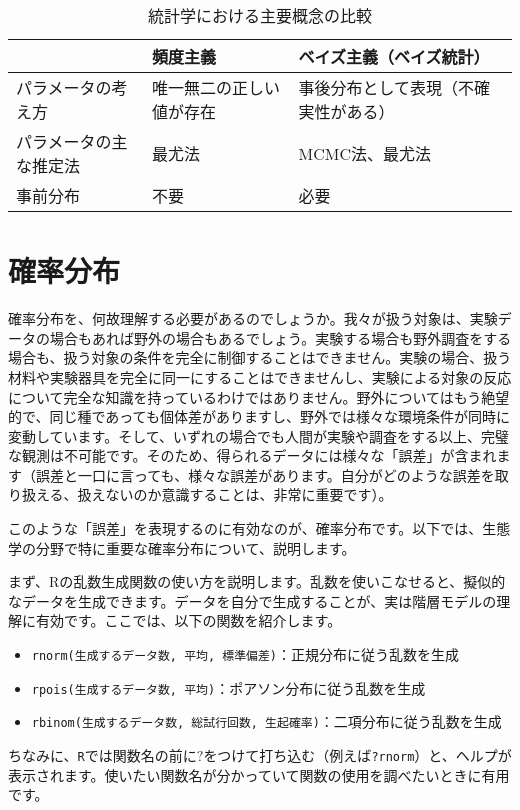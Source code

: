 \begin{table}
\begin{center}
\caption{統計学における主要概念の比較}
\label{philosophy}
\begin{tabularx}{\textwidth}{lXX} \toprule
 & 頻度主義 & ベイズ主義（ベイズ統計） \\ \midrule
パラメータの考え方 & 唯一無二の正しい値が存在 & 事後分布として表現（不確実性がある） \\
パラメータの主な推定法 & 最尤法 & MCMC法、最尤法 \\
事前分布 & 不要 & 必要 \\ \bottomrule
\end{tabularx}
\end{center}
\end{table}

\clearpage
\section{確率分布}
確率分布を、何故理解する必要があるのでしょうか。我々が扱う対象は、実験データの場合もあれば野外の場合もあるでしょう。実験する場合も野外調査をする場合も、扱う対象の条件を完全に制御することはできません。実験の場合、扱う材料や実験器具を完全に同一にすることはできませんし、実験による対象の反応について完全な知識を持っているわけではありません。野外についてはもう絶望的で、同じ種であっても個体差がありますし、野外では様々な環境条件が同時に変動しています。そして、いずれの場合でも人間が実験や調査をする以上、完璧な観測は不可能です。そのため、得られるデータには様々な「誤差」が含まれます（誤差と一口に言っても、様々な誤差があります。自分がどのような誤差を取り扱える、扱えないのか意識することは、非常に重要です）。

このような「誤差」を表現するのに有効なのが、確率分布です。以下では、生態学の分野で特に重要な確率分布について、説明します。

まず、Rの乱数生成関数の使い方を説明します。乱数を使いこなせると、擬似的なデータを生成できます。データを自分で生成することが、実は階層モデルの理解に有効です。ここでは、以下の関数を紹介します。
\begin{itemize}
  \item \verb|rnorm(生成するデータ数, 平均, 標準偏差)|：正規分布に従う乱数を生成
  \item \verb|rpois(生成するデータ数, 平均)|：ポアソン分布に従う乱数を生成
  \item \verb|rbinom(生成するデータ数, 総試行回数, 生起確率)|：二項分布に従う乱数を生成
\end{itemize}
ちなみに、\verb|R|では関数名の前に$?$をつけて打ち込む（例えば\verb|?rnorm|）と、ヘルプが表示されます。使いたい関数名が分かっていて関数の使用を調べたいときに有用です。

